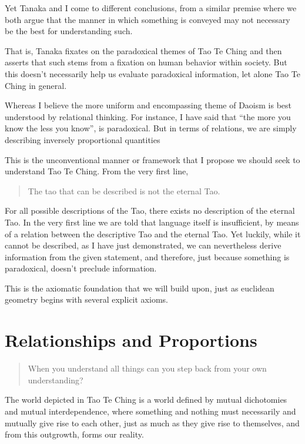 Yet Tanaka and I come to different conclusions, from a similar premise where we both argue that the manner in which something is conveyed may not necessary be the best for understanding such.

That is, Tanaka fixates on the paradoxical themes of Tao Te Ching and then asserts that such stems from a fixation on human behavior within society. But this doesn’t necessarily help us evaluate paradoxical information, let alone Tao Te Ching in general. 

Whereas I believe the more uniform and encompassing theme of Daoism is best understood by relational thinking. For instance, I have said that “the more you know the less you know”, is paradoxical. But in terms of relations, we are simply describing inversely proportional quantities

This is the unconventional manner or framework that I propose we should seek to understand Tao Te Ching. From the very first line,
\begin{verse}
The tao that can be described is not the eternal Tao.\\
\end{verse}

For all possible descriptions of the Tao, there exists no description of the eternal Tao. In the very first line we are told that language itself is insufficient, by means of a relation between the descriptive Tao and the eternal Tao. Yet luckily, while it cannot be described, as I have just demonstrated, we can nevertheless derive information from the given statement, and therefore, just because something is paradoxical, doesn't preclude information.

This is the axiomatic foundation that we will build upon, just as euclidean geometry begins with several explicit axioms.


\section{Relationships and Proportions}

\begin{verse}
When you understand all things can you step back from your own understanding?\\
\end{verse}

The world depicted in Tao Te Ching is a world defined by mutual dichotomies and mutual interdependence, where something and nothing must necessarily and mutually give rise to each other, just as much as they give rise to themselves, and from this outgrowth, forms our reality.

